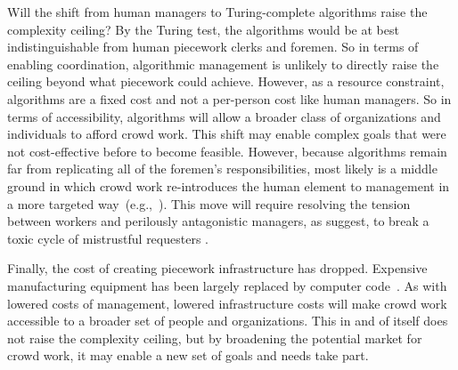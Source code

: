 \documentclass[trackingWork]{subfiles}
\begin{document}
Will the shift from human managers to Turing-complete algorithms raise the complexity ceiling? 
By the Turing test, the algorithms would be at best indistinguishable from human piecework clerks and foremen.
So in terms of enabling coordination, algorithmic management is unlikely to directly raise the ceiling beyond what piecework could achieve.
However, as a resource constraint, algorithms are a fixed cost and not a per-person cost like human managers.
So in terms of accessibility, algorithms will allow a broader class of organizations and individuals to afford crowd work.
This shift may enable complex goals that were not cost-effective before to become feasible.
However, because algorithms remain far from replicating all of the foremen's responsibilities, most likely is a middle ground in which crowd work re-introduces the human element to management in a more targeted way~(e.g.,~\cite{haas2015argonaut,kulkarni2012mobileworks,crowdguilds}).
This move will require resolving the tension between workers and perilously antagonistic managers, as \citeauthor{10.2307/2118435} suggest, to break a toxic cycle of mistrustful requesters \cite{MaliciousCrowdworkersGadiraju}.

Finally, the cost of creating piecework infrastructure has dropped. 
Expensive manufacturing equipment has been largely replaced by computer code~\cite{lessig2006code}.
As with lowered costs of management, lowered infrastructure costs will make crowd work accessible to a broader set of people and organizations.
This in and of itself does not raise the complexity ceiling, but by broadening the potential market for crowd work, it may enable a new set of goals and needs take part.

\onlyinsubfile{
  \balance{}
  \printbibliography
}
\end{document}
